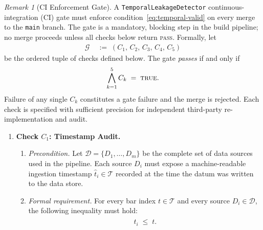 \documentclass[12pt,openany]{book}
\numberwithin{equation}{chapter}
\theoremstyle{plain}
\theoremstyle{definition}
\theoremstyle{remark}
\newtheorem{remark}[theorem]{Remark}
\numberwithin{equation}{chapter}
\theoremstyle{plain}
\begin{document}
\begin{remark}[CI Enforcement Gate]
\label{rem:ci-gate}
A \texttt{TemporalLeakageDetector} continuous-integration (CI) gate
must enforce condition~\eqref{eq:temporal-valid} on every merge to
the \texttt{main} branch.  The gate is a mandatory, blocking step
in the build pipeline; no merge proceeds unless all checks below
return \textsc{pass}.  Formally, let
\begin{align}
  \mathcal{G} &\;:=\;
    (C_{1},\,C_{2},\,C_{3},\,C_{4},\,C_{5})
  \label{eq:gate-tuple}
\end{align}
be the ordered tuple of checks defined below.  The gate
\emph{passes} if and only if
\begin{align}
  \bigwedge_{k=1}^{5} C_{k} \;=\; \textsc{true}.
  \label{eq:gate-pass}
\end{align}
Failure of any single $C_{k}$ constitutes a gate failure and the
merge is rejected.  Each check is specified with sufficient
precision for independent third-party re-implementation and audit.

\begin{enumerate}

  \item \textbf{Check $C_{1}$: Timestamp Audit.}
  \label{ci:timestamp}

  \begin{enumerate}

    \item \emph{Precondition.}
          Let $\mathcal{D} = \{D_{1}, \ldots, D_{m}\}$ be the
          complete set of data sources used in the pipeline.
          Each source $D_{i}$ must expose a machine-readable
          ingestion timestamp $\hat{t}_{i} \in \mathcal{T}$
          recorded at the time the datum was written to the
          data store.

    \item \emph{Formal requirement.}
          For every bar index $t \in \mathcal{T}$ and every
          source $D_{i} \in \mathcal{D}$, the following
          inequality must hold:
          \begin{align}
            \hat{t}_{i} \;\leq\; t.
            \label{eq:ci-timestamp}
          \end{align}


\end{enumerate}
\end{enumerate}
\end{remark}
\end{document}
